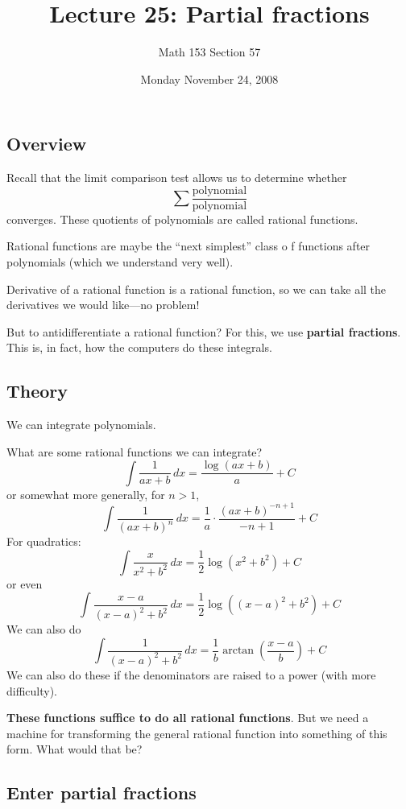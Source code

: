 \documentclass[12pt]{article}
\title{Lecture 25: Partial fractions}
\author{Math 153 Section 57}
\date{Monday November 24, 2008}
\begin{document}
\maketitle

\subsection*{Overview}

Recall that the limit comparison test allows us to determine whether
$$
\sum \frac{\mbox{polynomial}}{\mbox{polynomial}}
$$
converges.  These quotients of polynomials are called rational
functions.

Rational functions are maybe the ``next simplest'' class o f functions
after polynomials (which we understand very well).

Derivative of a rational function is a rational function, so we can
take all the derivatives we would like---no problem!

But to antidifferentiate a rational function?  For this, we use
\textbf{partial fractions}.  This is, in fact, how the computers do
these integrals.

\subsection*{Theory}

We can integrate polynomials.

What are some rational functions we can integrate?
$$
\int \frac{1}{ax + b} \, dx = \frac{\log (a x + b)}{a} + C
$$
or somewhat more generally, for $n > 1$,
$$
\int \frac{1}{(ax + b)^n} \, dx = \frac{1}{a} \cdot \frac{(a x + b)^{-n+1}}{-n+1} + C
$$
For quadratics:
$$
\int \frac{x}{x^2 + b^2} \, dx = \frac{1}{2} \log \left(x^2 + b^2\right) + C
$$
or even
$$
\int \frac{x - a}{(x-a)^2 + b^2} \, dx = \frac{1}{2} \log \left((x-a)^2 + b^2\right) + C
$$
We can also do
$$
\int \frac{1}{(x-a)^2 + b^2} \, dx = \frac{1}{b} \arctan \left(\frac{x-a}{b}\right) + C
$$
We can also do these if the denominators are raised to a power (with
more difficulty).

\textbf{These functions suffice to do all rational functions}.  But we
need a machine for transforming the general rational function into
something of this form.  What would that be?

\subsection*{Enter partial fractions}
\end{document}
